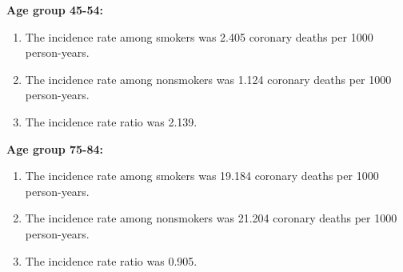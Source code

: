 \documentclass[a4paper,10pt]{article}\usepackage[]{graphicx}\usepackage[]{xcolor}
\begin{document}
\begin{enumerate}
\textbf{Age group 45-54:}

\begin{enumerate}
        \item The incidence rate among smokers was 2.405 coronary deaths per 1000 person-years.
        \item The incidence rate among nonsmokers was 1.124 coronary deaths per 1000 person-years.
        \item The incidence rate ratio was 2.139.
        
\end{enumerate}

        
\textbf{Age group 75-84:}

\begin{enumerate}
        \item The incidence rate among smokers was 19.184 coronary deaths per 1000 person-years.
        \item The incidence rate among nonsmokers was 21.204 coronary deaths per 1000 person-years.
        \item The incidence rate ratio was 0.905.
        
\end{enumerate}




\end{enumerate}
\end{document}
